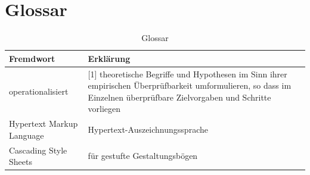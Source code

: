 \documentclass[a4paper, 12pt]{article}
\begin{document}
%
\newpage

\section{Glossar}
   \begin{table}[h!]
   	\caption{Glossar}
   	\label{tab:table1}
   	\begin{tabular}{|l|p{10cm}|}
   		\textbf{Fremdwort} & \textbf{Erklärung}\\
   		\hline
   		operationalisiert &[1] theoretische Begriffe und Hypothesen im Sinn ihrer empirischen Überprüfbarkeit umformulieren, so dass im Einzelnen überprüfbare Zielvorgaben und Schritte vorliegen\\
   		\hline
   		Hypertext Markup Language & Hypertext-Auszeichnungssprache\\
   		\hline
   		Cascading Style Sheets & für gestufte Gestaltungsbögen\\
   		\hline
   	\end{tabular}
\end{table}
\end{document}
